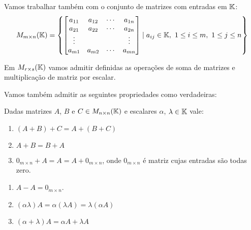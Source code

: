 \documentclass{beamer}
\begin{document}
    \begin{frame}
        Vamos trabalhar também com o conjunto de matrizes com entradas em $\mathbb{K}$:
        \[
            M_{m \times n}(\mathbb{K}) = 
            \left\{
                \begin{bmatrix}
                    a_{11} & a_{12} & \cdots & a_{1n}\\
		    a_{21} & a_{22} & \cdots & a_{2n}\\
		    \vdots & & & \vdots\\
		    a_{m1} & a_{m2} & \cdots & a_{mn}
                \end{bmatrix}
                \mid a_{ij} \in \mathbb{K},\ 1 \le i \le m,\ 1 \le j \le n
	    \right\}
        \]

        Em $M_{r\times s}(\mathbb{K})$ vamos admitir definidas as operações de soma de matrizes e multiplicação de matriz por escalar.

        Vamos também admitir as seguintes propriedades como verdadeiras:
        \begin{proposicao}
            Dadas matrizes $A$, $B$ e $C \in M_{n\times n}(\mathbb{K})$ e escalares $\alpha$, $\lambda \in \mathbb{K}$ vale:
            \begin{enumerate}[label={\roman*})]
                \item $(A + B) + C = A + (B + C)$
                \item $A + B = B + A$
                \item $0_{m \times n} + A = A = A + 0_{m \times n}$, onde $0_{m \times n}$ é matriz cujas entradas são todas zero.
                \seti
            \end{enumerate}
        \end{proposicao}
    \end{frame}

    \begin{frame}
        \begin{proposicao}
            \begin{enumerate}[label={\roman*})]
                \conti
                \item $A - A = 0_{m \times n}$.
                \item $(\alpha\lambda) A = \alpha(\lambda A) = \lambda(\alpha A)$
                \item $(\alpha + \lambda)A = \alpha A + \lambda A$
                \seti
            \end{enumerate}
        \end{proposicao}
    \end{frame}
\end{document}
